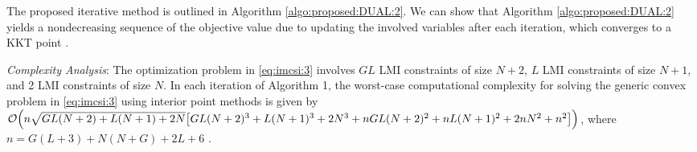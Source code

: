\documentclass[journal,twoside]{IEEEtran}
\begin{document}
The proposed iterative method is outlined in Algorithm \ref{algo:proposed:DUAL:2}. We can show  that Algorithm \ref{algo:proposed:DUAL:2} yields a nondecreasing  sequence of the objective value due to  updating the involved variables after each iteration, which converges to a KKT point \cite{Marks:78}.
\begin{algorithm}[t]
 \end{algorithm}

\textit{Complexity Analysis}: The optimization problem in \eqref{eq:imcsi:3}  involves $GL$ LMI constraints of size $N+2$, $L$ LMI constraints of size $N+1$, and 2 LMI constraints of size $N$. In each iteration of Algorithm 1, the worst-case computational complexity for solving the generic convex problem in \eqref{eq:imcsi:3} using interior point methods is given by $\mathcal{O}\Bigl(n\sqrt{GL(N+2) + L(N+1) + 2N}\bigl[GL(N+2)^3 + L(N+1)^3 + 2N^3 + nGL(N+2)^2 + nL(N+1)^2 + 2nN^2 +n^2\bigl]\Bigl)$, where $n = G(L+3)+N(N+G)+2L+6$ \cite{Ben:2001}.


\vspace{-0.3cm}
\end{document}
